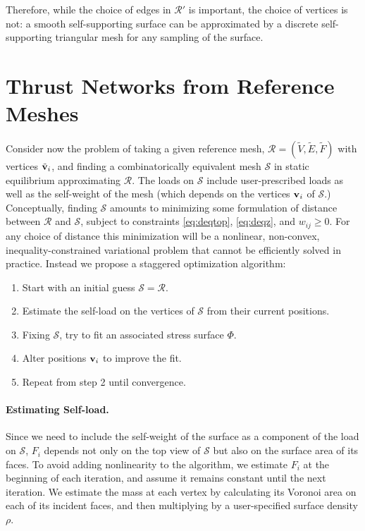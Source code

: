 \documentclass[annual]{acmsiggraph}
\def\SS{{\mathcal S}}
\def\RR{{\mathcal R}}
\begin{document}
Therefore, while the choice of edges in $\RR'$ is important, the choice of vertices is not: a smooth self-supporting surface can be approximated by
a discrete self-supporting triangular mesh for any sampling of the surface.

\section{Thrust Networks from Reference Meshes} \label{sec:opt} Consider
now the problem of taking a given reference mesh, $\RR =
(\tilde{V},\tilde{E},\tilde{F})$ with vertices $\tilde{{\mathbf v}}_i$, and
finding a combinatorically equivalent mesh $\SS$ in static equilibrium
approximating $\RR$. The loads on $\SS$ include user-prescribed loads as
well as the self-weight of the mesh (which depends on the vertices ${\mathbf v}_i$
of $\SS$.) Conceptually, finding $\SS$ amounts to minimizing some
formulation of distance between $\RR$ and $\SS$, subject to constraints
\eqref{eq:deqtop}, \eqref{eq:deqz}, and $w_{ij} \geq 0$. For any choice of
distance this minimization will be a nonlinear, non-convex,
inequality-constrained variational problem that cannot be efficiently
solved in practice. Instead we propose a staggered optimization algorithm:

\begin{enumerate}\itemsep-\parsep

\item Start with an initial guess $\SS = \RR$.

\item Estimate the self-load on the vertices of $\SS$ from their current
positions.

\item Fixing $\SS$, try to fit an associated stress surface $\Phi$.

\item Alter positions ${\mathbf v}_i$ to improve the fit.

\item Repeat from step 2 until convergence.

\end{enumerate}

\paragraph{Estimating Self-load.}

Since we need to include the self-weight of the surface as a component of
the load on $\SS$, $F_i$ depends not only on the top view of $\SS$ but
also on the surface area of its faces. To avoid adding nonlinearity to the
algorithm, we estimate $F_i$ at the beginning of each iteration, and
assume it remains constant until the next iteration. We estimate the mass
at each vertex by calculating its Voronoi area on each of its incident
faces, and then multiplying by a user-specified surface density $\rho$.
\end{document}
